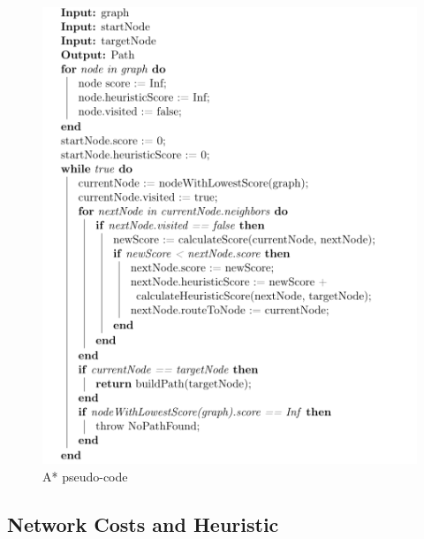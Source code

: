 \documentclass[11pt]{report}
\begin{document}
\begin{figure}[h!]
  \centering
  \includegraphics[width=0.78\linewidth]{a-star.png}
  \caption{A* pseudo-code \autocite{cox_2020}}
  \label{fig:4}
\end{figure}

\subsection{Network Costs and Heuristic}
\end{document}
